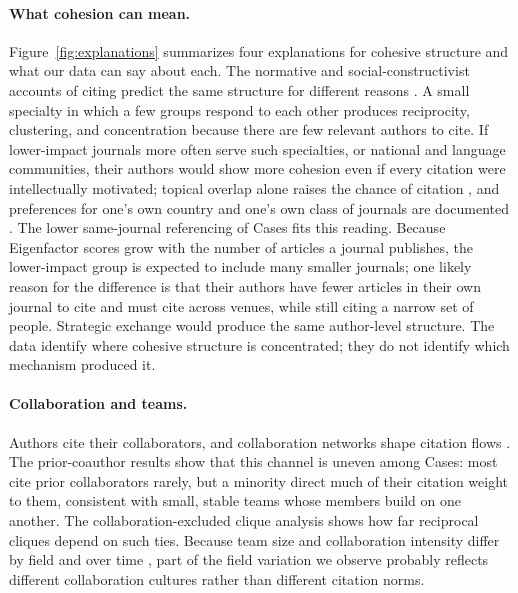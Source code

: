 \documentclass[12pt]{article}
\begin{document}
\paragraph{What cohesion can mean.}  Figure~\ref{fig:explanations} summarizes four explanations for cohesive structure and what our data can say about each.  The normative and social-constructivist accounts of citing predict the same structure for different reasons \parencite{Merton1988,Gilbert1977,Bornmann2008}.  A small specialty in which a few groups respond to each other produces reciprocity, clustering, and concentration because there are few relevant authors to cite.  If lower-impact journals more often serve such specialties, or national and language communities, their authors would show more cohesion even if every citation were intellectually motivated; topical overlap alone raises the chance of citation \parencite{Ciotti2016}, and preferences for one's own country and one's own class of journals are documented \parencite{Qiu2025,Perez2019}.  The lower same-journal referencing of Cases fits this reading.  Because Eigenfactor scores grow with the number of articles a journal publishes, the lower-impact group is expected to include many smaller journals; one likely reason for the difference is that their authors have fewer articles in their own journal to cite and must cite across venues, while still citing a narrow set of people.  Strategic exchange would produce the same author-level structure.  The data identify where cohesive structure is concentrated; they do not identify which mechanism produced it.

\paragraph{Collaboration and teams.}  Authors cite their collaborators, and collaboration networks shape citation flows \parencite{Wallace2012}.  The prior-coauthor results show that this channel is uneven among Cases: most cite prior collaborators rarely, but a minority direct much of their citation weight to them, consistent with small, stable teams whose members build on one another.  The collaboration-excluded clique analysis shows how far reciprocal cliques depend on such ties.
Because team size and collaboration intensity differ by field and over time \parencite{Wuchty2007,Newman2001}, part of the field variation we observe probably reflects different collaboration cultures rather than different citation norms.
\end{document}
